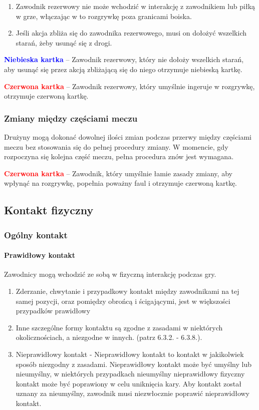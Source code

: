 \documentclass[12pt]{article}
\newcommand\redcard[1]{\bgroup\textcolor{red}{\textbf{#1}}}
\newcommand\bluecard[1]{\bgroup\textcolor{blue}{\textbf{#1}}}
\begin{document}
\begin{enumerate}
	\item
	      Zawodnik rezerwowy nie może wchodzić w interakcję z zawodnikiem lub
	      piłką w grze, włączając w to rozgrywkę poza granicami boiska.
	\item
	      Jeśli akcja zbliża się do zawodnika rezerwowego, musi on dołożyć
	      wszelkich starań, żeby usunąć się z drogi.
\end{enumerate}

\bluecard{Niebieska kartka} -- Zawodnik rezerwowy, który nie dołoży wszelkich
starań, aby usunąć się przez akcją zbliżającą się do niego otrzymuje
niebieską kartkę.

\redcard{Czerwona kartka} -- Zawodnik rezerwowy, który umyślnie ingeruje w
rozgrywkę, otrzymuje czerwoną kartkę.

\subsubsection{Zmiany między częściami meczu}

Drużyny mogą dokonać dowolnej ilości zmian podczas przerwy między
częściami meczu bez stosowania się do pełnej procedury zmiany. W
momencie, gdy rozpoczyna się kolejna część meczu, pełna procedura znów
jest wymagana.

\redcard{Czerwona kartka} -- Zawodnik, który umyślnie łamie zasady zmiany,
aby wpłynąć na rozgrywkę, popełnia poważny faul i otrzymuje czerwoną
kartkę.

\subsection{Kontakt fizyczny}

\subsubsection{Ogólny kontakt}

\paragraph{Prawidłowy kontakt}
Zawodnicy mogą wchodzić
ze sobą w fizyczną interakcję podczas gry.

\begin{enumerate}
	\item
	      Zderzanie, chwytanie i przypadkowy kontakt między zawodnikami na tej
	      samej pozycji, oraz pomiędzy obrońcą i ścigającymi, jest w większości
	      przypadków prawidłowy
	\item
	      Inne szczególne formy kontaktu są zgodne z zasadami w niektórych
	      okolicznościach, a niezgodne w innych. (patrz 6.3.2. - 6.3.8.).
	\item
	      Nieprawidłowy kontakt - Nieprawidłowy kontakt to kontakt w jakikolwiek
	      sposób niezgodny z zasadami. Nieprawidłowy kontakt może być umyślny
	      lub nieumyślny, w niektórych przypadkach nieumyślny nieprawidłowy
	      fizyczny kontakt może być poprawiony w celu uniknięcia kary. Aby
	      kontakt został uznany za nieumyślny, zawodnik musi niezwłocznie
	      poprawić nieprawidłowy kontakt.
\end{enumerate}
\end{document}
